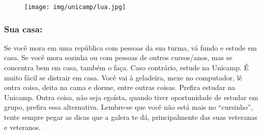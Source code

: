
\begin{figure}[h!]
  \centering
  \texttt{[image: img/unicamp/lua.jpg]}
\end{figure}

\subsubsection{Sua casa:} Se você mora em uma república com pessoas da sua
turma, vá fundo e estude em casa. Se você mora sozinha ou com pessoas de
outros cursos/anos, mas se concentra bem em casa, também o faça. Caso
contrário, estude na Unicamp. É muito fácil se distrair em casa. Você vai à
geladeira, mexe no computador, lê outra coisa, deita na cama e dorme, entre
outras coisas. Prefira estudar na Unicamp. Outra coisa, não seja egoísta,
quando tiver oportunidade de estudar em grupo, prefira essa alternativa.
Lembre-se que você não está mais no ``cursinho'', tente sempre pegar as dicas
que a galera te dá, principalmente das suas veteranas e veteranos.
